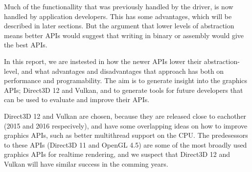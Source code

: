 Much of the functionallity that was previously handled by the driver, is now handled by application developers. 
This has some advantages, which will be described in later sections. 
But the argument that lower levels of abstraction means better \glspl{API} would suggest that writing in binary or assembly would give the best \glspl{API}.

In this report, we are instested in how the newer \glspl{API} lower their abstraction-level, and what advantages and disadvantages that approach has both on performance and programability.
The aim is to generate insight into the graphics \glspl{API}; Direct3D 12 and Vulkan, and to generate tools for future developers that can be used to evaluate and improve their \glspl{API}.

Direct3D 12 and Vulkan are chosen, because they are released close to eachother (2015 and 2016 respecively), and have some overlapping ideas on how to improve graphics \glspl{API}, such as better multithread support on the CPU.
The predesessors to these \glspl{API} (Direct3D 11 and OpenGL 4.5) are some of the most broadly used graphics \glspl{API} for realtime rendering, and we suspect that Direct3D 12 and Vulkan will have similar success in the comming years.







